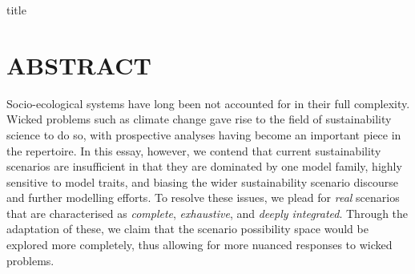 \documentclass{article}
\begin{document}
{title}

\frontmatter
\tableofcontents

\mainmatter
\linenumbers

{\huge{\multiTitle}}

\section*{ABSTRACT}
Socio-ecological systems have long been not accounted for in their full complexity. Wicked problems such as climate change gave rise to the field of sustainability science to do so, with prospective analyses having become an important piece in the repertoire. In this essay, however, we contend that current sustainability scenarios are insufficient in that they are dominated by one model family, highly sensitive to model traits, and biasing the wider sustainability scenario discourse and further modelling efforts. To resolve these issues, we plead for \textit{real} scenarios that are characterised as \textit{complete}, \textit{exhaustive}, and \textit{deeply integrated}. Through the adaptation of these, we claim that the scenario possibility space would be explored more completely, thus allowing for more nuanced responses to wicked problems.

\end{document}
